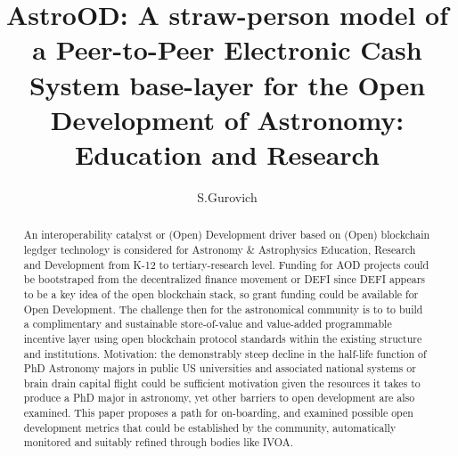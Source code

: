 \documentclass[final,5p,times,twocolumn,authoryear]{elsarticle}
\begin{document}
\begin{frontmatter}

\title{ AstroOD: A straw-person model of a Peer-to-Peer Electronic Cash System base-layer for the Open Development of Astronomy: Education and Research}
 
    \author[iate,wsu]{S.Gurovich}
  
\address[iate]{
   Instituto De Astronom\'ia Te\'orica y Experimental -
   Observatorio Astron\'omico C\'ordoba (IATE--OAC--UNC--CONICET),
   Laprida 854, X5000BGR, C\'ordoba, Argentina}
\address[wsu]{
   Western Sydney University, Kingswood campus, NSW, Australia
}

\begin{abstract}

An interoperability catalyst or (Open) Development driver based on (Open) blockchain legdger technology is considered for Astronomy \& Astrophysics Education, Research and Development from K-12 to tertiary-research level. Funding for AOD projects could be bootstraped from the decentralized finance movement or DEFI since DEFI appears to be a key idea of the open blockchain stack, so grant funding could be available for Open Development. The challenge then for the astronomical community is to to build a complimentary and sustainable store-of-value and value-added programmable incentive layer using open blockchain protocol standards within the existing structure and institutions. Motivation: the demonstrably steep decline in the half-life function of PhD Astronomy majors in public US universities and associated national systems or brain drain capital flight could be sufficient motivation given the resources it takes to produce a PhD major in astronomy, yet other barriers to open development are also examined. This paper proposes a path for on-boarding, and examined possible open development metrics that could be established by the community, automatically monitored and suitably refined through bodies like IVOA. 


\end{abstract}
\end{frontmatter}
\end{document}
